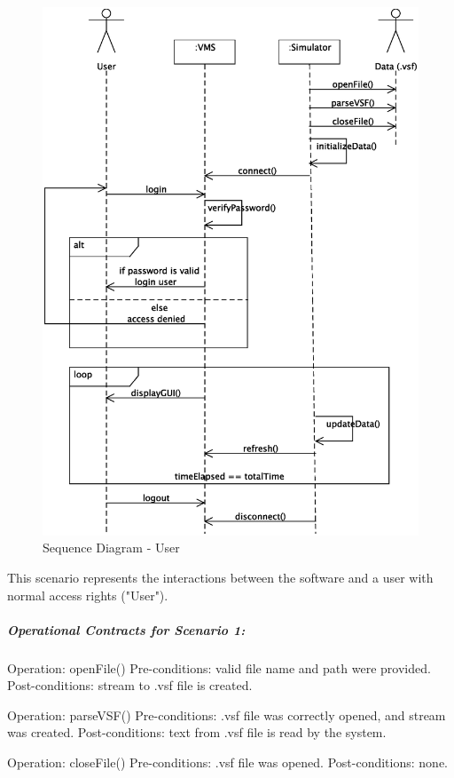 \documentclass{article}
\begin{document}
\begin{figure}[!htb]
\caption{Sequence Diagram - User}
\centering
\includegraphics[scale=0.6]{diagrams/user-sequence-diagram.eps}
\end{figure}

This scenario represents the interactions between the software and a user with normal access rights ("User").

\subparagraph{Operational Contracts for Scenario 1:}

Operation: openFile()
Pre-conditions: valid file name and path were provided.
Post-conditions: stream to .vsf file is created.

Operation: parseVSF()
Pre-conditions: .vsf file was correctly opened, and stream was created.
Post-conditions: text from .vsf file is read by the system.

Operation: closeFile()
Pre-conditions: .vsf file was opened.
Post-conditions: none.
\end{document}
